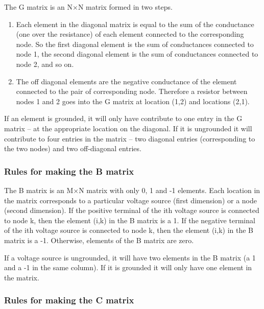 The G matrix is an N$\times$N matrix formed in two steps.

\begin{enumerate}
\item
Each element in the diagonal matrix is equal to the sum of the
conductance (one over the resistance) of each element connected to the
corresponding node.  So the first diagonal element is the sum of
conductances connected to node 1, the second diagonal element is the
sum of conductances connected to node 2, and so on.
\item
The off diagonal elements are the negative conductance of the element
connected to the pair of corresponding node.  Therefore a resistor
between nodes 1 and 2 goes into the G matrix at location (1,2) and
locations (2,1).
\end{enumerate}

If an element is grounded, it will only have contribute to one entry
in the G matrix -- at the appropriate location on the diagonal.  If it
is ungrounded it will contribute to four entries in the matrix -- two
diagonal entries (corresponding to the two nodes) and two off-diagonal
entries.

\subsubsection{Rules for making the B matrix}

The B matrix is an M$\times$N matrix with only 0, 1 and -1 elements.
Each location in the matrix corresponds to a particular voltage source
(first dimension) or a node (second dimension).  If the positive
terminal of the ith voltage source is connected to node k, then the
element (i,k) in the B matrix is a 1.  If the negative terminal of the
ith voltage source is connected to node k, then the element (i,k) in
the B matrix is a -1.  Otherwise, elements of the B matrix are zero.

\addvspace{12pt}

If a voltage source is ungrounded, it will have two elements in the B
matrix (a 1 and a -1 in the same column).  If it is grounded it will
only have one element in the matrix.

\subsubsection{Rules for making the C matrix}

